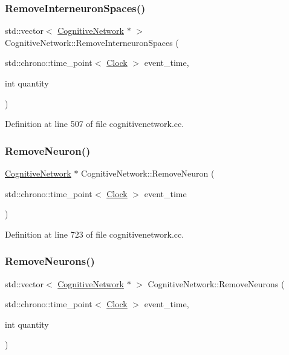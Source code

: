 \subsubsection{\texorpdfstring{Remove\+Interneuron\+Spaces()}{RemoveInterneuronSpaces()}}
{\footnotesize\ttfamily std\+::vector$<$ \mbox{\hyperlink{class_cognitive_network}{Cognitive\+Network}} $\ast$ $>$ Cognitive\+Network\+::\+Remove\+Interneuron\+Spaces (\begin{DoxyParamCaption}\item[{std\+::chrono\+::time\+\_\+point$<$ \mbox{\hyperlink{universe_8h_a0ef8d951d1ca5ab3cfaf7ab4c7a6fd80}{Clock}} $>$}]{event\+\_\+time,  }\item[{int}]{quantity }\end{DoxyParamCaption})}



Definition at line 507 of file cognitivenetwork.\+cc.

\mbox{\label{class_cognitive_network_a33e911ec87d902a8fd8bb6d9e23c4261}} 
\subsubsection{\texorpdfstring{Remove\+Neuron()}{RemoveNeuron()}}
{\footnotesize\ttfamily \mbox{\hyperlink{class_cognitive_network}{Cognitive\+Network}} $\ast$ Cognitive\+Network\+::\+Remove\+Neuron (\begin{DoxyParamCaption}\item[{std\+::chrono\+::time\+\_\+point$<$ \mbox{\hyperlink{universe_8h_a0ef8d951d1ca5ab3cfaf7ab4c7a6fd80}{Clock}} $>$}]{event\+\_\+time }\end{DoxyParamCaption})}



Definition at line 723 of file cognitivenetwork.\+cc.

\mbox{\label{class_cognitive_network_a130985ff0aa14b2a17fc2c589e65f868}} 
\subsubsection{\texorpdfstring{Remove\+Neurons()}{RemoveNeurons()}}
{\footnotesize\ttfamily std\+::vector$<$ \mbox{\hyperlink{class_cognitive_network}{Cognitive\+Network}} $\ast$ $>$ Cognitive\+Network\+::\+Remove\+Neurons (\begin{DoxyParamCaption}\item[{std\+::chrono\+::time\+\_\+point$<$ \mbox{\hyperlink{universe_8h_a0ef8d951d1ca5ab3cfaf7ab4c7a6fd80}{Clock}} $>$}]{event\+\_\+time,  }\item[{int}]{quantity }\end{DoxyParamCaption})}



